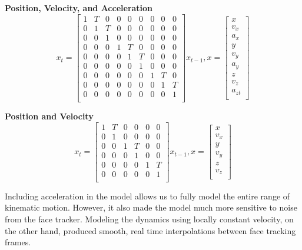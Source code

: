 \documentclass[10pt,twocolumn,letterpaper]{article}
\begin{document}
\textbf{Position, Velocity, and Acceleration}
$$ x_t =\begin{bmatrix}
  1 & T & 0 & 0 & 0 & 0 & 0 & 0 & 0 \\
  0 & 1 & T & 0 & 0 & 0 & 0 & 0 & 0 \\
  0 & 0 & 1 & 0 & 0 & 0 & 0 & 0 & 0 \\
  0 & 0 & 0 & 1 & T & 0 & 0 & 0 & 0 \\
  0 & 0 & 0 & 0 & 1 & T & 0 & 0 & 0 \\
  0 & 0 & 0 & 0 & 0 & 1 & 0 & 0 & 0 \\
  0 & 0 & 0 & 0 & 0 & 0 & 1 & T & 0 \\
  0 & 0 & 0 & 0 & 0 & 0 & 0 & 1 & T \\
  0 & 0 & 0 & 0 & 0 & 0 & 0 & 0 & 1 \\
\end{bmatrix} x_{t-1},
x =
\begin{bmatrix}
  x \\
  v_{x} \\
  a_{x} \\
  y \\
  v_{y} \\
  a_{y} \\
  z \\
  v_{z} \\
  a_{zt} \\
\end{bmatrix}$$

\textbf{Position and Velocity}
$$ x_t =\begin{bmatrix}
  1 & T & 0 & 0 & 0 & 0 \\
  0 & 1 & 0 & 0 & 0 & 0 \\
  0 & 0 & 1 & T & 0 & 0 \\
  0 & 0 & 0 & 1 & 0 & 0 \\
  0 & 0 & 0 & 0 & 1 & T \\
  0 & 0 & 0 & 0 & 0 & 1 \\
\end{bmatrix} x_{t-1},
x =
\begin{bmatrix}
  x \\
  v_{x} \\
  y \\
  v_{y} \\
  z \\
  v_{z} \\
\end{bmatrix}$$

Including acceleration in the model allows us to fully model the entire range of kinematic motion. However, it also made the model much more sensitive to noise from the face tracker. Modeling the dynamics using locally constant velocity, on the other hand, produced smooth, real time interpolations between face tracking frames. 
\end{document}
